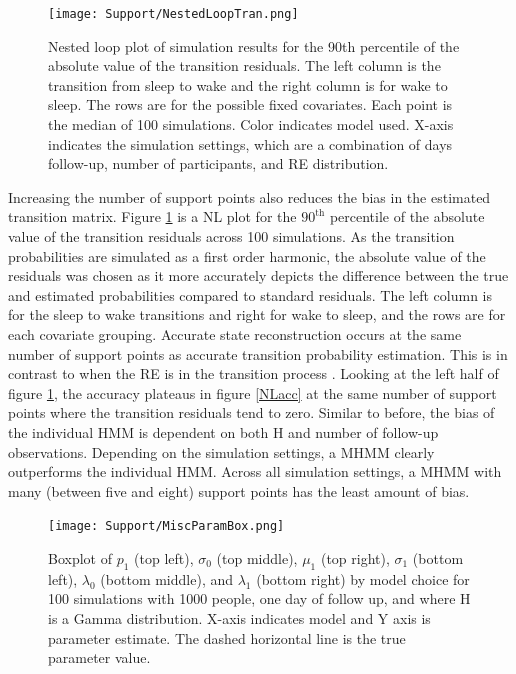 \documentclass[num-refs]{wiley-article}
\begin{document}
\begin{figure}
    \texttt{[image: Support/NestedLoopTran.png]}
    \centering
    \caption{Nested loop plot of simulation results for the 90th percentile of the absolute value of the transition residuals. The left column is the transition from sleep to wake and the right column is for wake to sleep. The rows are for the possible fixed covariates. Each point is the median of 100 simulations. Color indicates model used. X-axis indicates the simulation settings, which are a combination of days follow-up, number of participants, and RE distribution.}
    \label{NLtran}
\end{figure}

Increasing the number of support points also reduces the bias in the estimated transition matrix. Figure \ref{NLtran} is a NL plot for the $90^{\text{th}}$ percentile of the absolute value of the transition residuals across 100 simulations. As the transition probabilities are simulated as a first order harmonic, the absolute value of the residuals was chosen as it more accurately depicts the difference between the true and estimated probabilities compared to standard residuals. The left column is for the sleep to wake transitions and right for wake to sleep, and the rows are for each covariate grouping. Accurate state reconstruction occurs at the same number of support points as accurate transition probability estimation. This is in contrast to when the RE is in the transition process \cite{mcclintock2021}. Looking at the left half of figure \ref{NLtran}, the accuracy plateaus in figure \ref{NLacc} at the same number of support points where the transition residuals tend to zero. Similar to before, the bias of the individual HMM is dependent on both H and number of follow-up observations. Depending on the simulation settings, a MHMM clearly outperforms the individual HMM. Across all simulation settings, a MHMM with many (between five and eight) support points has the least amount of bias.

\begin{figure}
    \texttt{[image: Support/MiscParamBox.png]}
    \centering
    \caption{Boxplot of $p_1$ (top left), $\sigma_0$ (top middle), $\mu_1$ (top right), $\sigma_1$ (bottom left), $\lambda_0$ (bottom middle), and $\lambda_1$ (bottom right) by model choice for 100 simulations with 1000 people, one day of follow up, and where H is a Gamma distribution. X-axis indicates model and Y axis is parameter estimate. The dashed horizontal line is the true parameter value.}
    \label{miscParam}
\end{figure}
\end{document}

